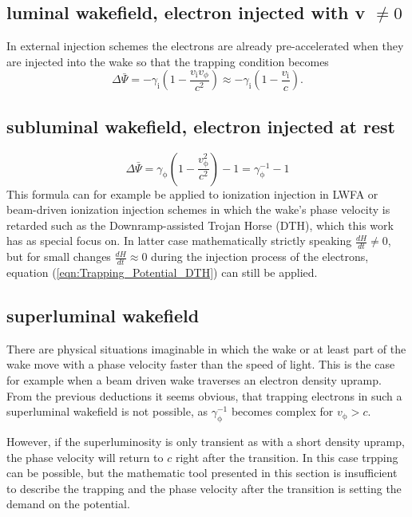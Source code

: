 \subsection*{luminal wakefield, electron injected  with v $\neq 0$}
In external injection schemes the electrons are already pre-accelerated when they are injected into the wake so that the trapping condition becomes
\begin{equation}
\Delta \bar{\Psi}= -\gamma_\mathrm{i}(1-\frac{v_\mathrm{i}v_\phi}{c^2})\approx -\gamma_\mathrm{i}(1-\frac{v_\mathrm{i}}{c}).
\end{equation}
\subsection*{subluminal wakefield, electron injected at rest}

\begin{equation}
\label{eqn:Trapping_Potential_DTH}
\Delta \bar{\Psi}=\gamma_\mathrm{\phi}(1-\frac{v_\mathrm{\phi}^2}{c^2})-1=\gamma_\mathrm{\phi}^{-1}-1
\end{equation}
This formula can for example be applied to ionization injection in LWFA\cite{PakPRL2012} or beam-driven ionization injection schemes in which the wake's phase velocity is retarded such as the Downramp-assisted Trojan Horse (DTH)\cite{DTH}, which this work has as special focus on. In latter case mathematically strictly speaking $\frac{d H}{dt}\neq0 $, but for small changes $\frac{dH}{dt}\approx 0$ during the injection process of the electrons, equation (\ref{eqn:Trapping_Potential_DTH}) can still be applied.

\subsection*{superluminal wakefield}
There are physical situations imaginable in which the wake or at least part of the wake move with a phase velocity faster than the speed of light. This is the case for example when a beam driven wake traverses an electron density upramp.
From the previous deductions it seems obvious, that trapping electrons in such a superluminal wakefield is not possible, as $\gamma_\mathrm{\phi}^{-1}$ becomes complex for $v_\mathrm{\phi}>c$.

However, if the superluminosity is only transient as with a short density upramp, the phase velocity will return to $c$ right after the transition. In this case trpping can be possible, but the mathematic tool presented in this section is insufficient to describe the trapping and the phase velocity after the transition is setting the demand on the potential.
